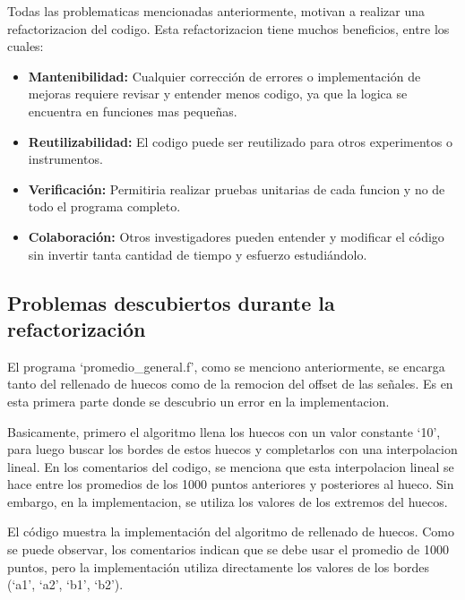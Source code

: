 \documentclass[12pt,a4paper]{article}
\begin{document}
Todas las problematicas mencionadas anteriormente, motivan a realizar una refactorizacion del codigo. Esta refactorizacion tiene muchos beneficios, entre los cuales:

\begin{itemize}

\item \textbf{Mantenibilidad:} Cualquier corrección de errores o implementación de mejoras requiere revisar y entender menos codigo, ya que la logica se encuentra en funciones mas pequeñas.

\item \textbf{Reutilizabilidad:} El codigo puede ser reutilizado para otros experimentos o instrumentos.

\item \textbf{Verificación:} Permitiria realizar pruebas unitarias de cada funcion y no de todo el programa completo.

\item \textbf{Colaboración:} Otros investigadores pueden entender y modificar el código sin
invertir tanta cantidad de tiempo y esfuerzo estudiándolo.

\end{itemize}

\subsection{Problemas descubiertos durante la refactorización}

El programa `promedio\_general.f', como se menciono anteriormente, se encarga tanto del rellenado de huecos como de la remocion del offset de las señales. Es en esta primera parte donde se descubrio un error en la implementacion.

Basicamente, primero el algoritmo llena los huecos con un valor constante `10', para luego buscar los bordes de estos huecos y completarlos con una interpolacion lineal. En los comentarios del codigo, se menciona que esta interpolacion lineal se hace entre los promedios de los 1000 puntos anteriores y posteriores al hueco. Sin embargo, en la implementacion, se utiliza los valores de los extremos del huecos.

El código  muestra la implementación del algoritmo de rellenado de huecos. Como se puede observar, los comentarios indican que se debe usar el promedio de 1000 puntos, pero la implementación utiliza directamente los valores de los bordes (`a1', `a2', `b1', `b2').
\end{document}
